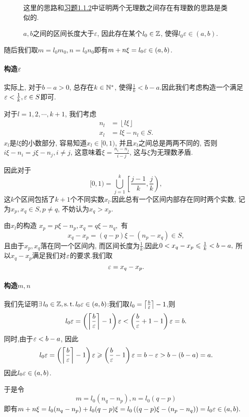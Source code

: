 \begin{solution}
\begin{figure}[htbp]
\begin{center}
\end{center}

    \caption{$a, b$之间的区间长度大于$\varepsilon$, 因此存在某个$l_0\in\mathbb{Z}$, 使得$l_0\varepsilon\in(a, b)$.}这里的思路和\hyperref[exe:1.1.2]{习题1.1.2}中证明两个无理数之间存在有理数的思路是类似的.
    \label{fig:1.C.16}
\end{figure}


    随后我们取$m=l_0m_0, n=l_0n_0$即有$m+n\xi=l_0\varepsilon\in(a, b)$.

    \paragraph*{构造$\varepsilon$}

    实际上, 对于$b-a>0$, 总存在$k\in\mathbb{N}^*$, 使得$\frac{1}{k}<{b-a}$.因此我们考虑构造一个满足$\varepsilon<\frac{1}{k}, \varepsilon\in S$即可.

    对于$l=1, 2, \cdots, k+1$, 我们考虑
    \begin{align*}
        n_l & =\left\lfloor l\xi \right\rfloor \\
        x_l & =l\xi-n_l \in S.
    \end{align*}
    $x_l$是$l\xi$的小数部分, 容易知道$x_l\in[0, 1)$, 并且$x_l$之间总是两两不同的, 否则$i\xi-n_i=j\xi-n_j, i\neq j$, 这意味着$\xi=\frac{n_i-n_j}{i-j}$, 这与$\xi$为无理数矛盾.

    因此对于$$[0, 1)=\bigcup_{j=1}^{k} \left[ \frac{j-1}{k}, \frac{j}{k} \right), $$
    这$k$个区间包括了$k+1$个不同实数$x_l$.因此总有一个区间内部存在同时两个实数, 记为$x_p, x_q \in S, p\neq q$, 不妨认为$x_q>x_p$.

    由$x_l$的构造 $x_p=p\xi-n_p, x_q=q\xi-n_q,$
    有$$ x_q-x_p=(q-p)\xi-(n_p-x_q)\in S,$$
    且由于$x_p, x_q$落在同一个区间内, 而区间长度为$\frac{1}{k}$,因此$0<x_q-x_p\leqslant\frac{1}{k}< {b-a},$
    所以$x_q-x_p$满足我们对$\varepsilon$的要求.我们取$$\varepsilon=x_q-x_p.$$

    \paragraph*{构造$m, n$}

    我们先证明$\exists l_0\in\Z, \st l_0\ve\in(a, b)$:我们取$l_0 = \left\lceil \frac{b}{\varepsilon} \right\rceil - 1$,则$$l_0 \varepsilon = \left(\left\lceil \frac{b}{\varepsilon} \right\rceil - 1\right)\varepsilon < \left(\frac{b}{\varepsilon} + 1 - 1\right)\varepsilon = b.$$
    同时,由于$\varepsilon < {b-a}$, 因此$$l_0 \varepsilon = \left(\left\lceil \frac{b}{\varepsilon} \right\rceil - 1\right)\varepsilon \geqslant \left(\frac{b}{\varepsilon} - 1\right)\varepsilon = b - \varepsilon > b - (b-a) = a.$$
    因此$l_0\varepsilon\in(a, b)$.
    
    于是令$$m=l_0(n_q-n_p), n=l_0(q-p)$$
    即有$m+n\xi=l_0 (n_q-n_p)+l_0(q-p)\xi=l_0 \left( (q-p)\xi-(n_p-n_q) \right)=l_0\varepsilon\in(a, b).$
\end{solution}





\newpage